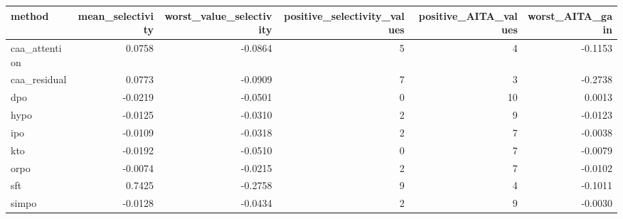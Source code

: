 \begin{tabular}{lrrrrr}
\toprule
method & mean\_selectivity & worst\_value\_selectivity & positive\_selectivity\_values & positive\_AITA\_values & worst\_AITA\_gain \\
\midrule
caa\_attention & 0.0758 & -0.0864 & 5 & 4 & -0.1153 \\
caa\_residual & 0.0773 & -0.0909 & 7 & 3 & -0.2738 \\
dpo & -0.0219 & -0.0501 & 0 & 10 & 0.0013 \\
hypo & -0.0125 & -0.0310 & 2 & 9 & -0.0123 \\
ipo & -0.0109 & -0.0318 & 2 & 7 & -0.0038 \\
kto & -0.0192 & -0.0510 & 0 & 7 & -0.0079 \\
orpo & -0.0074 & -0.0215 & 2 & 7 & -0.0102 \\
sft & 0.7425 & -0.2758 & 9 & 4 & -0.1011 \\
simpo & -0.0128 & -0.0434 & 2 & 9 & -0.0030 \\
\bottomrule
\end{tabular}
